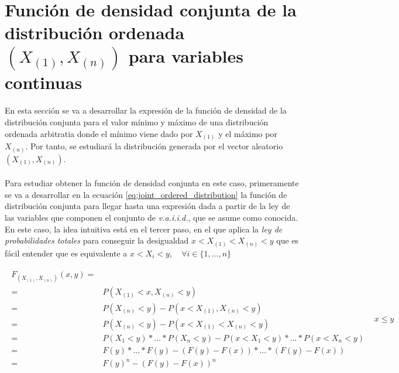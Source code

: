 \documentclass{article}
\begin{document}
  \section{Función de densidad conjunta de la distribución ordenada $(X_{(1)}, X_{(n)})$ para variables continuas}
  \label{sec:e2}

    \paragraph{}
    En esta sección se va a desarrollar la expresión de la función de densidad de la distribución conjunta para el valor mínimo y máximo de una distribución ordenada arbitratia donde el mínimo viene dado por $X_{(1)}$ y el máximo por $X_{(n)}$. Por tanto, se estudiará la distribución generada por el vector aleatorio $(X_{(1)}, X_{(n)})$.

    \paragraph{}
    Para estudiar obtener la función de densidad conjunta en este caso, primeramente se va a desarrollar en la ecuación \ref{eq:joint_ordered_distribution} la función de distribución conjunta para llegar hasta una expresión dada a partir de la ley de las variables que componen el conjunto de \emph{v.a.i.i.d.}, que se asume como conocida. En este caso, la idea intuitiva está en el tercer paso, en el que aplica la \emph{ley de probabilidades totales} para conseguir la desigualdad $x < X_{(1)} < X_{(n)} < y$ que es fácil entender que es equivalente a $x < X_i < y,\quad \forall i \in \{1, ..., n\}$

    \begin{align}
    \label{eq:joint_ordered_distribution}
      \begin{split}
        F_{(X_{(1)}, X_{(n)})} (x,y) =& \\
        =& P(X_{(1)} < x, X_{(n)} < y) \\
        =& P(X_{(n)} < y) - P(x < X_{(1)}, X_{(n)} < y) \\
        =& P(X_{(n)} < y) - P(x < X_{(1)} < X_{(n)} < y) \\
        =& P(X_{1} < y) * ... * P(X_{n} < y) - P(x < X_1 < y) * ... * P(x < X_n < y) \\
        =& F(y) * ... *F(y)  - (F(y)-F(x)) * ... * (F(y)-F(x)) \\
        =& F(y)^n - (F(y)-F(x))^n
      \end{split} & x \leq y
    \end{align}
\end{document}
